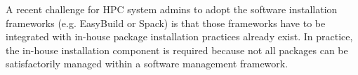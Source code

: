 \documentclass[conference]{IEEEtran}
\begin{document}


A recent challenge for HPC system admins to adopt the software installation frameworks (e.g. EasyBuild\cite{geimer:14} or Spack\cite{gamblin:15}) is that those frameworks have to be integrated with in-house package installation practices already exist. In practice, the in-house installation component is required because not all packages can be satisfactorily managed within a software management framework.
\end{document}
